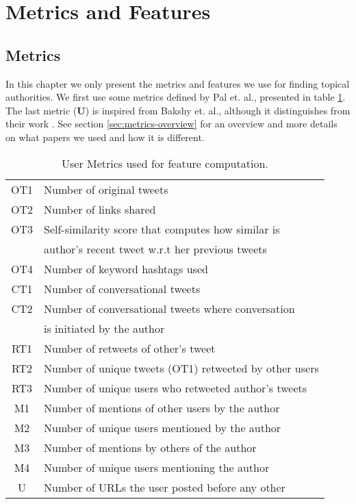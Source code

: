 \section{Metrics and Features}
\label{sec:metrics-features}

\subsection{Metrics}

In this chapter we only present the metrics and features we use for finding topical authorities.
We first use some metrics defined by Pal et. al.\cite{microblogs}, presented in table \ref{table:metrics}. The last metric (\textbf{U}) is inspired from Bakshy et. al., although it distinguishes from their work \cite{bakshy}. See section \ref{sec:metrics-overview} for an overview and more details on what papers we used and how it is different.


\begin{table}[!h]
\setlength{\tabcolsep}{12pt}
\begin{tabular}{ c | l }
OT1 & Number of original tweets \\
OT2 & Number of links shared \\
OT3 & Self-similarity score that computes how similar is\\     & author's recent tweet w.r.t her previous tweets \\
OT4 & Number of keyword hashtags used \\
\hline  
CT1 & Number of conversational tweets \\
CT2 & Number of conversational tweets where conversation \\
	& is initiated by the author \\
\hline
RT1 & Number of retweets of other's tweet \\
RT2 & Number of unique tweets (OT1) retweeted by other users \\
RT3 & Number of unique users who retweeted author's tweets \\
\hline
M1  & Number of mentions of other users by the author \\
M2  & Number of unique users mentioned by the author \\
M3  & Number of mentions by others of the author \\
M4  & Number of unique users mentioning the author \\
\hline
U   & Number of URLs the user posted before any other \\
\end{tabular}
\caption{User Metrics used for feature computation.}
\label{table:metrics}
\end{table}

